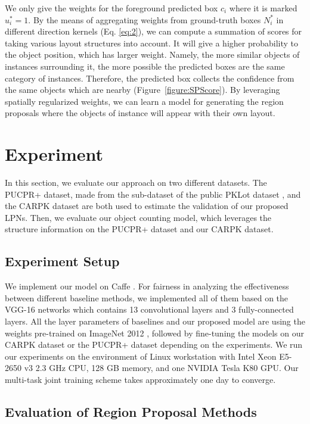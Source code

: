 \documentclass[10pt,twocolumn,letterpaper]{article}
\begin{document}
We only give the weights for the foreground predicted box $c_{i}$ where it is marked $u_{i}^{*} = 1$. By the means of aggregating weights from ground-truth boxes $N_{i}^{*}$ in different direction kernels (Eq. \ref{eq:2}), we can compute a summation of scores for taking various layout structures into account. It will give a higher probability to the object position, which has larger weight. Namely, the more similar objects of instances surrounding it, the more possible the predicted boxes are the same category of instances. Therefore, the predicted box collects the confidence from the same objects which are nearby (Figure~\ref{figure:SPScore}). By leveraging spatially regularized weights, we can learn a model for generating the region proposals where the objects of instance will appear with their own layout.

\section{Experiment}
In this section, we evaluate our approach on two different datasets. The PUCPR+ dataset, made from the sub-dataset of the public PKLot dataset \cite{01_de2015pklot}, and the CARPK dataset are both used to estimate the validation of our proposed LPNs. Then, we evaluate our object counting model, which leverages the structure information on the PUCPR+ dataset and our CARPK dataset.

\subsection{Experiment Setup}
We implement our model on Caffe \cite{40_jia2014caffe}. For fairness in analyzing the effectiveness between different baseline methods, we implemented all of them based on the VGG-16 networks \cite{06_simonyan2014very} which contains 13 convolutional layers and 3 fully-connected layers. All the layer parameters of baselines and our proposed model are using the weights pre-trained on ImageNet 2012 \cite{41_russakovsky2015imagenet}, followed by fine-tuning the models on our CARPK dataset or the PUCPR+ dataset depending on the experiments. We run our experiments on the environment of Linux workstation with Intel Xeon E5-2650 v3 2.3 GHz CPU, 128 GB memory, and one NVIDIA Tesla K80 GPU. Our multi-task joint training scheme takes approximately one day to converge.

\subsection{Evaluation of Region Proposal Methods}
\end{document}
